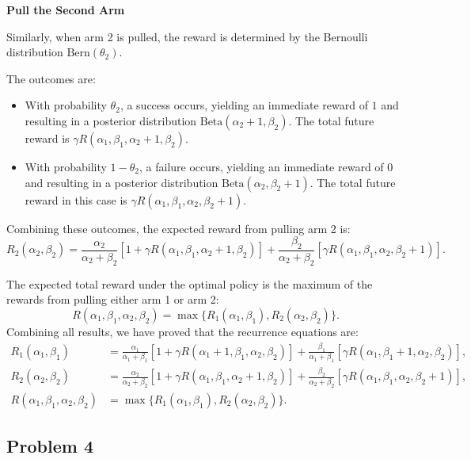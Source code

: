\documentclass[11pt]{article}
\begin{document}
\noindent\textbf{Pull the Second Arm}

Similarly, when arm 2 is pulled, the reward is determined by the Bernoulli distribution \( \text{Bern}(\theta_2) \). 

The outcomes are:
\begin{itemize}
    \item With probability \(\theta_2\), a success occurs, yielding an immediate reward of \( 1 \) and resulting in a posterior distribution \( \text{Beta}(\alpha_2 + 1, \beta_2) \). The total future reward is \(\gamma R(\alpha_1, \beta_1, \alpha_2 + 1, \beta_2)\).
    \item With probability \(1 - \theta_2\), a failure occurs, yielding an immediate reward of \( 0 \) and resulting in a posterior distribution \( \text{Beta}(\alpha_2, \beta_2 + 1) \). The total future reward in this case is \(\gamma R(\alpha_1, \beta_1, \alpha_2, \beta_2 + 1)\).
\end{itemize}
Combining these outcomes, the expected reward from pulling arm 2 is:
\[
R_2(\alpha_2, \beta_2) = \frac{\alpha_2}{\alpha_2 + \beta_2} [1 + \gamma R(\alpha_1, \beta_1, \alpha_2 + 1, \beta_2)] + \frac{\beta_2}{\alpha_2 + \beta_2} [\gamma R(\alpha_1, \beta_1, \alpha_2, \beta_2 + 1)].
\]

The expected total reward under the optimal policy is the maximum of the rewards from pulling either arm 1 or arm 2:
\[
R(\alpha_1, \beta_1, \alpha_2, \beta_2) = \max\{R_1(\alpha_1, \beta_1), R_2(\alpha_2, \beta_2)\}.
\]
Combining all results, we have proved that the recurrence equations are:
\begin{align*}
R_1(\alpha_1, \beta_1) &= \frac{\alpha_1}{\alpha_1 + \beta_1}[1 + \gamma R(\alpha_1 + 1, \beta_1, \alpha_2, \beta_2)] + \frac{\beta_1}{\alpha_1 + \beta_1}[\gamma R(\alpha_1, \beta_1 + 1, \alpha_2, \beta_2)], \\
R_2(\alpha_2, \beta_2) &= \frac{\alpha_2}{\alpha_2 + \beta_2}[1 + \gamma R(\alpha_1, \beta_1, \alpha_2 + 1, \beta_2)] + \frac{\beta_2}{\alpha_2 + \beta_2}[\gamma R(\alpha_1, \beta_1, \alpha_2, \beta_2 + 1)], \\
R(\alpha_1, \beta_1, \alpha_2, \beta_2) &= \max\{R_1(\alpha_1, \beta_1), R_2(\alpha_2, \beta_2)\}.
\end{align*}


\newpage
\subsection{Problem 4}
\end{document}
